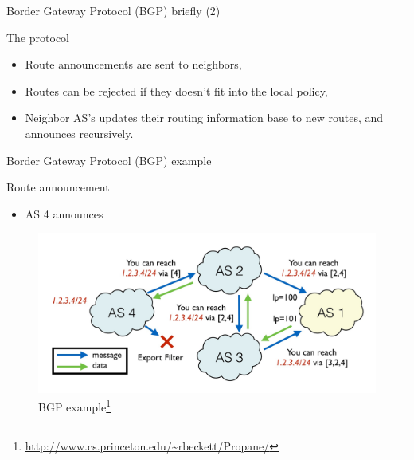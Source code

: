 \begin{frame}{Border Gateway Protocol (BGP) briefly (2)}
    \begin{block}{The protocol}
        \begin{itemize}
            \item Route announcements are sent to neighbors,
            \item Routes can be \textcolor{ReneOrange}{rejected} if they doesn't fit into the local policy,
            \item Neighbor AS's updates their routing information base to new routes, and announces recursively.
        \end{itemize}
    \end{block}
\end{frame}

\begin{frame}{Border Gateway Protocol (BGP) example}
    \begin{block}{Route announcement}
        \begin{itemize}
            \item AS 4 announces 
        \end{itemize}
    \end{block}
    \begin{figure}
        \includegraphics[height=0.5\textheight,keepaspectratio]{figures/BGP-protocol.jpg}
        \caption*{BGP example\footnote{\url{http://www.cs.princeton.edu/~rbeckett/Propane/}}}
    \end{figure}
\end{frame}
